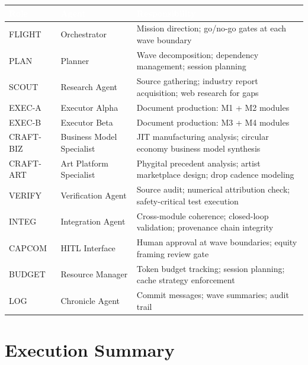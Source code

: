 \documentclass[11pt,letterpaper]{article}
\newcommand{\tableheader}[1]{\textbf{\sffamily\textcolor{white}{#1}}}
\begin{document}
\begin{center}
\begin{tabularx}{\textwidth}{L{2.5cm}L{3cm}X}
\toprule
{}
\tableheader{Role} & \tableheader{Agent} & \tableheader{Responsibility} \\
\midrule
FLIGHT & Orchestrator & Mission direction; go/no-go gates at each wave boundary \\
PLAN & Planner & Wave decomposition; dependency management; session planning \\
SCOUT & Research Agent & Source gathering; industry report acquisition; web research for gaps \\
EXEC-A & Executor Alpha & Document production: M1 + M2 modules \\
EXEC-B & Executor Beta & Document production: M3 + M4 modules \\
CRAFT-BIZ & Business Model Specialist & JIT manufacturing analysis; circular economy business model synthesis \\
CRAFT-ART & Art Platform Specialist & Phygital precedent analysis; artist marketplace design; drop cadence modeling \\
VERIFY & Verification Agent & Source audit; numerical attribution check; safety-critical test execution \\
INTEG & Integration Agent & Cross-module coherence; closed-loop validation; provenance chain integrity \\
CAPCOM & HITL Interface & Human approval at wave boundaries; equity framing review gate \\
BUDGET & Resource Manager & Token budget tracking; session planning; cache strategy enforcement \\
LOG & Chronicle Agent & Commit messages; wave summaries; audit trail \\
\bottomrule
\end{tabularx}
\end{center}

\section{Execution Summary}
\end{document}
